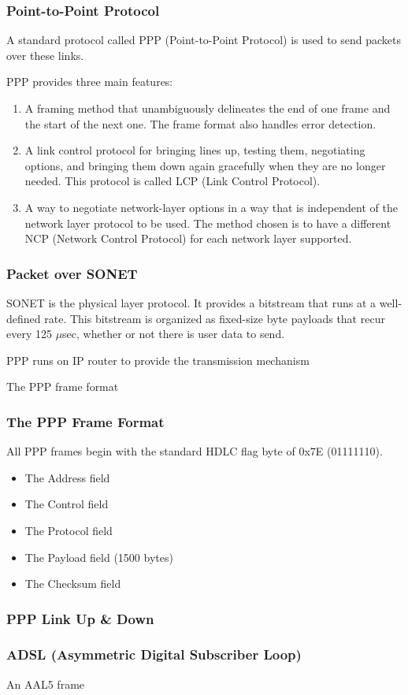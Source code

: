 \subsubsection{Point-to-Point Protocol}
A standard protocol called PPP (Point-to-Point Protocol) is used to send packets over these links.


PPP provides three main features:
\begin{enumerate}
    \item A framing method that unambiguously delineates the end of one frame and the
    start of the next one. The frame format also handles error detection.
    \item A link control protocol for bringing lines up, testing them, negotiating options,
    and bringing them down again gracefully when they are no longer needed. This
    protocol is called LCP (Link Control Protocol).
    \item A way to negotiate network-layer options in a way that is independent of the
    network layer protocol to be used. The method chosen is to have a different
    NCP (Network Control Protocol) for each network layer supported.
\end{enumerate}


\subsubsection{Packet over SONET}
SONET is the physical layer protocol. It provides a bitstream that runs at a well-defined rate. This bitstream is organized as fixed-size byte payloads that recur every 125 $\mu$sec, whether or not there is user data to send.

PPP runs on IP router to provide the transmission mechanism %

The PPP frame format %


\subsubsection{The PPP Frame Format}
All PPP frames begin with the standard HDLC flag byte of 0x7E (01111110).%

\begin{itemize}
    \item The Address field
    \item The Control field
    \item The Protocol field
    \item The Payload field (1500 bytes)
    \item The Checksum field
\end{itemize}

\subsubsection{PPP Link Up \& Down}

\subsubsection{ADSL (Asymmetric Digital Subscriber Loop)}


An AAL5 frame %

